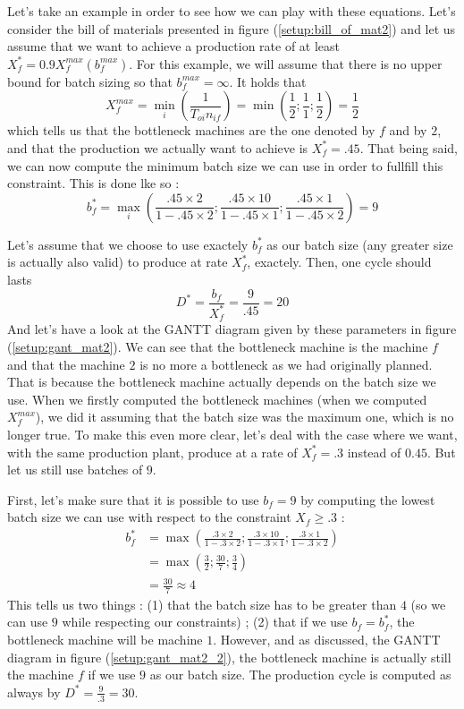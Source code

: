 Let's take an example in order to see how we can play with these equations. Let's consider the bill of materials presented in figure (\ref{setup:bill_of_mat2}) and let us assume that we want to achieve a production rate of at least $X_f^* = 0.9 X_f^{max}(b_f^{max})$. For this example, we will assume that there is no upper bound for batch sizing so that $b_f^{max} = \infty$. It holds that \[ X_f^{max} = \min_i\left( \frac{1}{T_{oi}n_{if}} \right) = \min\left( \frac{1}{2} ; \frac{1}{1} ; \frac{1}{2} \right) = \frac{1}{2} \] which tells us that the bottleneck machines are the one denoted by $f$ and by $2$, and that the production we actually want to achieve is $X_f^* = .45$. That being said, we can now compute the minimum batch size we can use in order to fullfill this constraint. This is done lke so : \[ b_f^* = \max_i\left( \frac{.45\times 2}{1 - .45\times 2} ; \frac{.45\times 10}{1 - .45\times 1} ; \frac{.45\times 1}{1 - .45\times 2} \right) = 9 \]

Let's assume that we choose to use exactely $b_f^*$ as our batch size (any greater size is actually also valid) to produce at rate $X_f^*$, exactely. Then, one cycle should lasts \[ D^* = \frac{b_f}{X_f^*}=\frac{9}{.45} = 20 \] And let's have a look at the GANTT diagram given by these parameters in figure (\ref{setup:gant_mat2}). We can see that the bottleneck machine is the machine $f$ and that the machine $2$ is no more a bottleneck as we had originally planned. That is because the bottleneck machine actually depends on the batch size we use. When we firstly computed the bottleneck machines (when we computed $X_f^{max}$), we did it assuming that the batch size was the maximum one, which is no longer true. To make this even more clear, let's deal with the case where we want, with the same production plant, produce at a rate of $X_f^*=.3$ instead of $0.45$. But let us still use batches of $9$. 

First, let's make sure that it is possible to use $b_f = 9$ by computing the lowest batch size we can use with respect to the constraint $X_f\ge .3$ :
\[
    \begin{split}
        b_f^* &= \max\left( \frac{.3\times 2}{1 - .3\times 2} ; \frac{.3\times 10}{1 - .3\times 1} ; \frac{.3\times 1}{1-.3\times 2} \right)\\
        &= \max\left( \frac{3}{2} ; \frac{30}{7} ; \frac{3}{4} \right)\\
        &= \frac{30}{7} \approx 4
    \end{split}
\]
This tells us two things : (1) that the batch size has to be greater than $4$ (so we can use $9$ while respecting our constraints) ; (2) that if we use $b_f = b_f^*$, the bottleneck machine will be machine $1$. However, and as discussed, the GANTT diagram in figure (\ref{setup:gant_mat2_2}), the bottleneck machine is actually still the machine $f$ if we use $9$ as our batch size. The production cycle is computed as always by $D^* = \frac{9}{.3} = 30$. 

